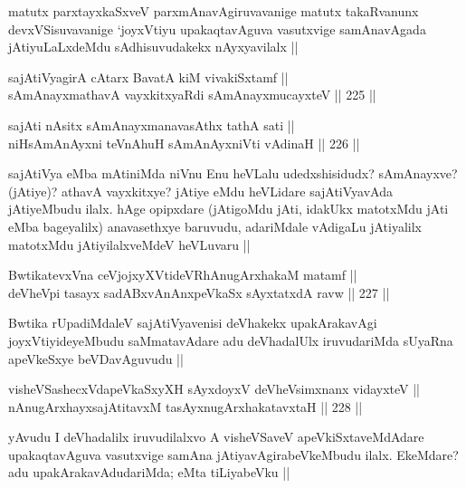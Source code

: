 \begin{artha}
matutx parxtayxkaSxveV parxmAnavAgiruvavanige matutx takaRvanunx devxVSisuvavanige `joyxVtiyu upakaqtavAguva vasutxvige samAnavAgada jAtiyuLaLxdeMdu sAdhisuvudakekx nAyxyavilalx ||
\end{artha}

\begin{shl}
sajAtiVyagirA cAtarx BavatA kiM vivakiSxtamf || \\
sAmAnayxmathavA vayxkitxyaRdi sAmAnayxmucayxteV ||  225 ||  
\end{shl}
				
\begin{shl}
sajAti nAsitx sAmAnayxmanavasAthx tathA sati || \\
niHsAmAnAyxni teVnA\s \s huH sAmAnAyxniVti vAdinaH ||  226 || 
\end{shl}

\begin{artha}
sajAtiVya eMba mAtiniMda niVnu Enu heVLalu udedxshisidudx? sAmAnayxve? (jAtiye)? athavA vayxkitxye? jAtiye eMdu heVLidare sajAtiVyavAda jAtiyeMbudu ilalx. hAge opipxdare (jAtigoMdu jAti, idakUkx matotxMdu jAti eMba bageyalilx) anavasethxye baruvudu, adariMdale vAdigaLu jAtiyalilx matotxMdu jAtiyilalxveMdeV heVLuvaru ||
\end{artha}

\begin{shl}
BwtikatevxVna ceVjojxyXVtideVRhAnugArxhakaM matamf || \\
deVheV\s pi tasayx sadABxvAnAnxpeVkaSx sAyxtatxdA ravw ||  227 ||  
\end{shl}

\begin{artha}
Bwtika rUpadiMdaleV sajAtiVyavenisi deVhakekx upakArakavAgi joyxVtiyideyeMbudu saMmatavAdare adu deVhadalUlx iruvudariMda sUyaRna apeVkeSxye beVDavAguvudu ||
\end{artha}

\begin{shl}
visheVSashecxVdapeVkaSxyXH sAyxdoyxV deVheV\s simxnanx vidayxteV || \\
nAnugArxhayxsajAtitavxM tasAyxnugArxhakatavxtaH ||  228 ||  
\end{shl}

\begin{artha}
yAvudu I deVhadalilx iruvudilalxvo A visheVSaveV apeVkiSxtaveMdAdare upakaqtavAguva vasutxvige samAna jAtiyavAgirabeVkeMbudu ilalx. EkeMdare? adu upakArakavAdudariMda; eMta tiLiyabeVku ||
\end{artha}

